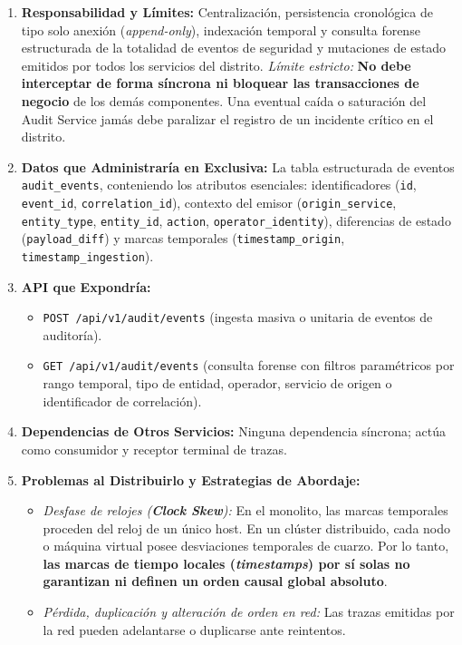 \documentclass[10pt,a4paper]{article}
\begin{document}
\begin{enumerate}[leftmargin=*]
    \item \textbf{Responsabilidad y Límites:} Centralización, persistencia cronológica de tipo solo anexión (\textit{append-only}), indexación temporal y consulta forense estructurada de la totalidad de eventos de seguridad y mutaciones de estado emitidos por todos los servicios del distrito. \textit{Límite estricto:} \textbf{No debe interceptar de forma síncrona ni bloquear las transacciones de negocio} de los demás componentes. Una eventual caída o saturación del Audit Service jamás debe paralizar el registro de un incidente crítico en el distrito.
    \item \textbf{Datos que Administraría en Exclusiva:} La tabla estructurada de eventos \texttt{audit\_events}, conteniendo los atributos esenciales: identificadores (\texttt{id}, \texttt{event\_id}, \texttt{correlation\_id}), contexto del emisor (\texttt{origin\_service}, \texttt{entity\_type}, \texttt{entity\_id}, \texttt{action}, \texttt{operator\_identity}), diferencias de estado (\texttt{payload\_diff}) y marcas temporales (\texttt{timestamp\_origin}, \texttt{timestamp\_ingestion}).
    \item \textbf{API que Expondría:}
    \begin{itemize}[leftmargin=*]
        \item \texttt{POST /api/v1/audit/events} (ingesta masiva o unitaria de eventos de auditoría).
        \item \texttt{GET /api/v1/audit/events} (consulta forense con filtros paramétricos por rango temporal, tipo de entidad, operador, servicio de origen o identificador de correlación).
    \end{itemize}
    \item \textbf{Dependencias de Otros Servicios:} Ninguna dependencia síncrona; actúa como consumidor y receptor terminal de trazas.
    \item \textbf{Problemas al Distribuirlo y Estrategias de Abordaje:}
    \begin{itemize}[leftmargin=*]
        \item \textit{Desfase de relojes (\textbf{Clock Skew}):} En el monolito, las marcas temporales proceden del reloj de un único host. En un clúster distribuido, cada nodo o máquina virtual posee desviaciones temporales de cuarzo. Por lo tanto, \textbf{las marcas de tiempo locales (\textit{timestamps}) por sí solas no garantizan ni definen un orden causal global absoluto}.
        \item \textit{Pérdida, duplicación y alteración de orden en red:} Las trazas emitidas por la red pueden adelantarse o duplicarse ante reintentos.

\end{itemize}
\end{enumerate}
\end{document}
